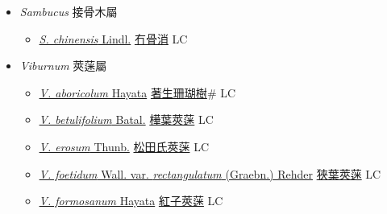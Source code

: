 
  \begin{itemize}
 \item[] \textit{Sambucus} 接骨木屬
                    
  \begin{itemize}
        \item[] \href{http://www.theplantlist.org/tpl1.1/search?q=Sambucus+chinensis}{\textit{S. chinensis} Lindl.}   \href{\detokenize{http://taibnet.sinica.edu.tw/chi/taibnet_species_list.php?T2=冇骨消&T2_new_value=true&fr=y}}{冇骨消} LC
  \end{itemize}
 \item[] \textit{Viburnum} 莢蒾屬
                    
  \begin{itemize}
        \item[] \href{http://www.theplantlist.org/tpl1.1/search?q=Viburnum+aboricolum}{\textit{V. aboricolum} Hayata}   \href{\detokenize{http://taibnet.sinica.edu.tw/chi/taibnet_species_list.php?T2=著生珊瑚樹&T2_new_value=true&fr=y}}{著生珊瑚樹}\# LC
        \item[] \href{http://www.theplantlist.org/tpl1.1/search?q=Viburnum+betulifolium}{\textit{V. betulifolium} Batal.}   \href{\detokenize{http://taibnet.sinica.edu.tw/chi/taibnet_species_list.php?T2=樺葉莢蒾&T2_new_value=true&fr=y}}{樺葉莢蒾} LC
        \item[] \href{http://www.theplantlist.org/tpl1.1/search?q=Viburnum+erosum}{\textit{V. erosum} Thunb.}   \href{\detokenize{http://taibnet.sinica.edu.tw/chi/taibnet_species_list.php?T2=松田氏莢蒾&T2_new_value=true&fr=y}}{松田氏莢蒾} LC
        \item[] \href{http://www.theplantlist.org/tpl1.1/search?q=Viburnum+foetidum+var.+rectangulatum}{\textit{V. foetidum} Wall. var. \textit{rectangulatum} (Graebn.) Rehder}   \href{\detokenize{http://taibnet.sinica.edu.tw/chi/taibnet_species_list.php?T2=狹葉莢蒾&T2_new_value=true&fr=y}}{狹葉莢蒾} LC
        \item[] \href{http://www.theplantlist.org/tpl1.1/search?q=Viburnum+formosanum}{\textit{V. formosanum} Hayata}   \href{\detokenize{http://taibnet.sinica.edu.tw/chi/taibnet_species_list.php?T2=紅子莢蒾&T2_new_value=true&fr=y}}{紅子莢蒾} LC

\end{itemize}
\end{itemize}
